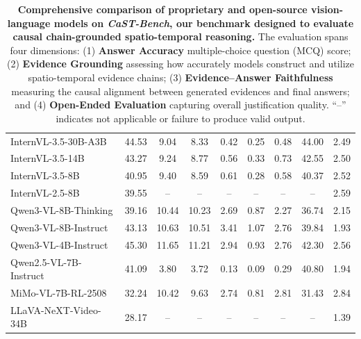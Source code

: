 \begin{table}[t]
{{\begin{tabular}{@{}l*8{c}@{}}
InternVL-3.5-30B-A3B \cite{wang2025internvl3_5}
& 44.53 & 9.04 & 8.33 & 0.42 & 0.25 & 0.48 & 44.00 & 2.49 \\
InternVL-3.5-14B \cite{wang2025internvl3_5}
& 43.27 & 9.24 & 8.77 & 0.56 & 0.33 & 0.73 & 42.55 & 2.50 \\
InternVL-3.5-8B \cite{wang2025internvl3_5}
& 40.95 & 9.40 & 8.59 & 0.61 & 0.28 & 0.58 & 40.37 & 2.52 \\
InternVL-2.5-8B \cite{chen2024internvl25}
& 39.55 & -- & -- & -- & -- & -- & -- & 2.59 \\
Qwen3-VL-8B-Thinking \cite{qwen3vl2025} & 39.16 & 10.44 & 10.23 & 2.69 & 0.87 & 2.27 & 36.74 & 2.15 \\
Qwen3-VL-8B-Instruct \cite{qwen3vl2025} & 43.13 & 10.63 & 10.51 & 3.41 & 1.07 & 2.76 & 39.84 & 1.93 \\
Qwen3-VL-4B-Instruct \cite{qwen3vl2025} & 45.30 & 11.65 & 11.21 & 2.94 & 0.93 & 2.76 & 42.30 & 2.56 \\
Qwen2.5-VL-7B-Instruct \cite{Qwen2.5-VL}
& 41.09 & 3.80 & 3.72 & 0.13 & 0.09 & 0.29 & 40.80 & 1.94 \\
MiMo-VL-7B-RL-2508 \cite{coreteam2025mimovltechnicalreport}
& 32.24 & 10.42 & 9.63 & 2.74 & 0.81 & 2.81 & 31.43 & 2.84 \\
LLaVA-NeXT-Video-34B \cite{zhang2024llavanextvideo}
& 28.17 & -- & -- & -- & -- & -- & -- & 1.39 \\
\bottomrule
\end{tabular}%
}
}
\caption{
\textbf{Comprehensive comparison of proprietary and open-source vision-language models on \textit{CaST-Bench}, our benchmark designed to evaluate causal chain-grounded spatio-temporal reasoning.}
The evaluation spans four dimensions:
(1) \textbf{Answer Accuracy} multiple-choice question (MCQ) score;
(2) \textbf{Evidence Grounding} assessing how accurately models construct and utilize spatio-temporal evidence chains;
(3) \textbf{Evidence--Answer Faithfulness} measuring the causal alignment between generated evidences and final answers;
and (4) \textbf{Open-Ended Evaluation} capturing overall justification quality.
“--” indicates not applicable or failure to produce valid output.
}
\label{tab:main_table}
\end{table}

